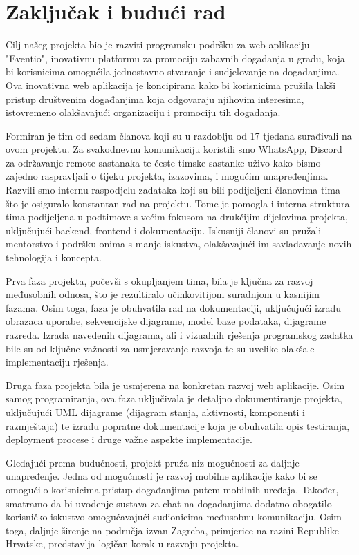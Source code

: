 \chapter{Zaključak i budući rad}
		
		Cilj našeg projekta bio je razviti programsku podršku za web aplikaciju "Eventio", inovativnu platformu za promociju zabavnih događanja u gradu, koja bi korisnicima omogućila jednostavno stvaranje i sudjelovanje na događanjima. Ova inovativna web aplikacija je koncipirana kako bi korisnicima pružila lakši pristup društvenim događanjima koja odgovaraju njihovim interesima, istovremeno olakšavajući organizaciju i promociju tih događanja.
		
		Formiran je tim od sedam članova koji su u razdoblju od 17 tjedana surađivali na ovom projektu. Za svakodnevnu komunikaciju koristili smo WhatsApp, Discord za održavanje remote sastanaka te česte timske sastanke uživo kako bismo zajedno raspravljali o tijeku projekta, izazovima, i mogućim unapređenjima. Razvili smo internu raspodjelu zadataka koji su bili podijeljeni članovima tima što je osiguralo konstantan rad na projektu. Tome je pomogla i interna struktura tima podijeljena u podtimove s većim fokusom na drukčijim dijelovima projekta, uključujući backend, frontend i dokumentaciju. Iskusniji članovi su pružali mentorstvo i podršku onima s manje iskustva, olakšavajući im savladavanje novih tehnologija i koncepta.
		
		Prva faza projekta, počevši s okupljanjem tima, bila je ključna za razvoj međusobnih odnosa, što je rezultiralo učinkovitijom suradnjom u kasnijim fazama. Osim toga, faza je obuhvatila rad na dokumentaciji, uključujući izradu obrazaca uporabe, sekvencijske dijagrame, model baze podataka, dijagrame razreda. Izrada navedenih dijagrama, ali i vizualnih rješenja programskog zadatka bile su od ključne važnosti za usmjeravanje razvoja te su uvelike olakšale implementaciju rješenja.
		
		Druga faza projekta bila je usmjerena na konkretan razvoj web aplikacije. Osim samog programiranja, ova faza uključivala je detaljno dokumentiranje projekta, uključujući UML dijagrame (dijagram stanja, aktivnosti, komponenti i razmještaja) te izradu popratne dokumentacije koja je obuhvatila opis testiranja, deployment procese i druge važne aspekte implementacije.
		
		Gledajući prema budućnosti, projekt pruža niz mogućnosti za daljnje unapređenje. Jedna od mogućnosti je razvoj mobilne aplikacije kako bi se omogućilo korisnicima pristup događanjima putem mobilnih uređaja. Također, smatramo da bi uvođenje sustava za chat na događanjima dodatno obogatilo korisničko iskustvo omogućavajući sudionicima međusobnu komunikaciju. Osim toga, daljnje širenje na područja izvan Zagreba, primjerice na razini Republike Hrvatske, predstavlja logičan korak u razvoju projekta.
		
